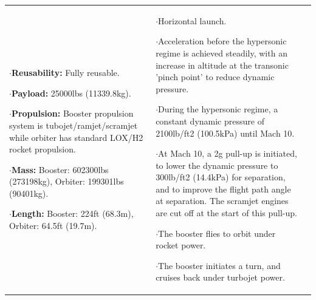 {\begin{landscape}
\begin{xltabular}{\linewidth}{|X|X|X|}
	$\cdot$\textbf{Reusability:} Fully reusable.
	
	$\cdot$\textbf{Payload:} 25000lbs (11339.8kg).
	
	$\cdot$\textbf{Propulsion:} Booster propulsion system is tubojet/ramjet/scramjet while orbiter has standard LOX/H2 rocket propulsion. 
	
	$\cdot$\textbf{Mass:} Booster: 602300lbs (273198kg), Orbiter: 199301lbs (90401kg).
	
	$\cdot$\textbf{Length:} Booster: 224ft (68.3m), Orbiter: 64.5ft (19.7m).
	&\small
	
	$\cdot$Horizontal launch.
	
	$\cdot$Acceleration before the hypersonic regime is achieved steadily, with an increase in altitude at the transonic 'pinch point' to reduce dynamic pressure. 
	
	$\cdot$During the hypersonic regime, a constant dynamic pressure of 2100lb/ft2 (100.5kPa) until Mach 10.
	
	$\cdot$At Mach 10, a 2g pull-up is initiated, to lower the dynamic pressure to 300lb/ft2 (14.4kPa) for separation, and to improve the flight path angle at separation. The scramjet engines are cut off at the start of this pull-up.  
	
	$\cdot$The booster flies to orbit under rocket power. 
	
	$\cdot$The booster initiates a turn, and cruises back under turbojet power. 
	

\end{xltabular}
\end{landscape}}
